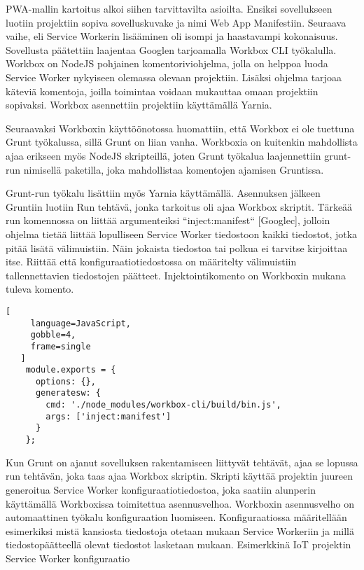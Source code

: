 \documentclass{tktltiki}
\begin{document}
PWA-mallin kartoitus alkoi siihen tarvittavilta asioilta. Ensiksi sovellukseen luotiin projektiin sopiva sovelluskuvake ja nimi Web App Manifestiin. Seuraava vaihe, eli Service Workerin lisääminen oli isompi ja haastavampi kokonaisuus. Sovellusta päätettiin laajentaa Googlen tarjoamalla Workbox CLI työkalulla. Workbox on NodeJS pohjainen komentoriviohjelma, jolla on helppoa luoda Service Worker nykyiseen olemassa olevaan projektiin. Lisäksi ohjelma tarjoaa käteviä komentoja, joilla toimintaa voidaan mukauttaa omaan projektiin sopivaksi. Workbox asennettiin projektiin käyttämällä Yarnia.

Seuraavaksi Workboxin käyttöönotossa huomattiin, että Workbox ei ole tuettuna Grunt työkalussa, sillä Grunt on liian vanha. Workboxia on kuitenkin mahdollista ajaa erikseen myös NodeJS skripteillä, joten Grunt työkalua laajennettiin grunt-run nimisellä paketilla, joka mahdollistaa komentojen ajamisen Gruntissa. 

Grunt-run työkalu lisättiin myös Yarnia käyttämällä. Asennuksen jälkeen Gruntiin luotiin Run tehtävä, jonka tarkoitus oli ajaa Workbox skriptit. Tärkeää run komennossa on liittää argumenteiksi “inject:manifest“ [Googlec], jolloin ohjelma tietää liittää lopulliseen Service Worker tiedostoon kaikki tiedostot, jotka pitää lisätä välimuistiin. Näin jokaista tiedostoa tai polkua ei tarvitse kirjoittaa itse. Riittää että konfiguraatiotiedostossa on määritelty välimuistiin tallennettavien tiedostojen päätteet. Injektointikomento on Workboxin mukana tuleva komento.

\begin{lstlisting}[
     language=JavaScript,
     gobble=4,
     frame=single
   ]
    module.exports = {
      options: {},
      generatesw: {
        cmd: './node_modules/workbox-cli/build/bin.js',
        args: ['inject:manifest']
      }
    };
\end{lstlisting}

Kun Grunt on ajanut sovelluksen rakentamiseen liittyvät tehtävät, ajaa se lopussa run tehtävän, joka taas ajaa Workbox skriptin. Skripti käyttää projektin juureen generoitua Service Worker konfiguraatiotiedostoa, joka saatiin alunperin käyttämällä Workboxissa toimitettua asennusvelhoa. Workboxin asennusvelho on automaattinen työkalu konfiguraation luomiseen. Konfiguraatiossa määritellään esimerkiksi mistä kansiosta tiedostoja otetaan mukaan Service Workeriin ja millä tiedostopäätteellä olevat tiedostot lasketaan mukaan. Esimerkkinä IoT projektin Service Worker konfiguraatio
\end{document}
